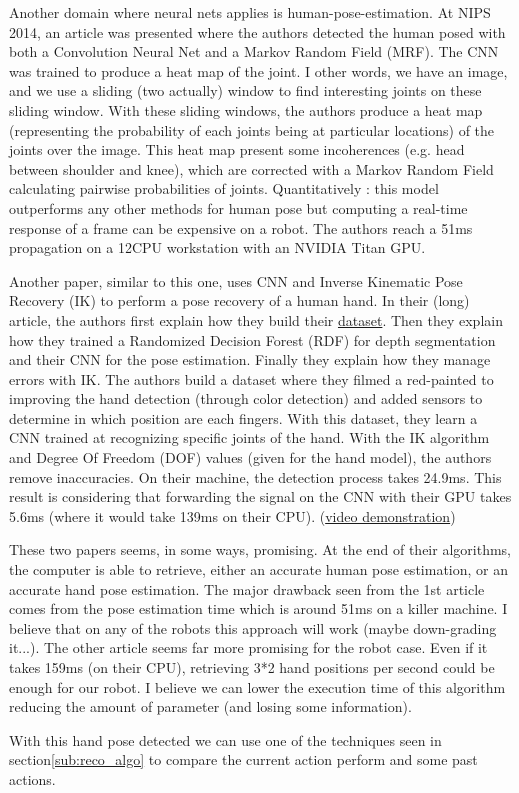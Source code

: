 \documentclass[a4paper]{article}
\begin{document}
			Another domain where neural nets applies is human-pose-estimation. At NIPS 2014, an article\cite{tompson2014joint} was presented where the authors detected the human posed with both a Convolution Neural Net and a Markov Random Field (MRF). The CNN was trained to produce a heat map of the joint. I other words, we have an image, and we use a sliding (two actually) window to find interesting joints on these sliding window. With these sliding windows, the authors produce a heat map (representing the probability of each joints being at particular locations) of the joints over the image. This heat map present some incoherences (e.g. head between shoulder and knee), which are corrected with a Markov Random Field calculating pairwise probabilities of joints. Quantitatively : this model outperforms any other methods for human pose but computing a real-time response of a frame can be expensive on a robot. The authors reach a 51ms propagation on a 12CPU workstation with an NVIDIA Titan GPU. 

			Another paper\cite{tompson2014real}, similar to this one, uses CNN and Inverse Kinematic Pose Recovery (IK) to perform a pose recovery of a human hand. In their (long) article, the authors first explain how they build their \href{http://cims.nyu.edu/~tompson/NYU_Hand_Pose_Dataset.htm}{dataset}. Then they explain how they trained a Randomized Decision Forest (RDF) for depth segmentation and their CNN for the pose estimation. Finally they explain how they manage errors with IK. The authors build a dataset where they filmed a red-painted to improving the hand detection (through color detection) and added sensors to determine in which position are each fingers. With this dataset, they learn a CNN trained at recognizing specific joints of the hand. With the IK algorithm and Degree Of Freedom (DOF) values (given for the hand model), the authors remove inaccuracies. On their machine, the detection process takes 24.9ms. This result is considering that forwarding the signal on the CNN with their GPU takes 5.6ms (where it would take 139ms on their CPU). (\href{https://www.youtube.com/watch?v=J4c_x1QnW0A}{video demonstration})

			\begin{mdframed}[backgroundcolor = gray!30]
				These two papers seems, in some ways, promising. At the end of their algorithms, the computer is able to retrieve, either an accurate human pose estimation, or an accurate hand pose estimation. The major drawback seen from the 1st article comes from the pose estimation time which is around 51ms on a killer machine. I believe that on any of the robots this approach will work (maybe down-grading it...). The other article seems far more promising for the robot case. Even if it takes 159ms (on their CPU), retrieving 3*2 hand positions per second could be enough for our robot. I believe we can lower the execution time of this algorithm reducing the amount of parameter (and losing some information).

				With this hand pose detected we can use one of the techniques seen in section\ref{sub:reco_algo} to compare the current action perform and some past actions. 
			\end{mdframed}






 
\end{document}
